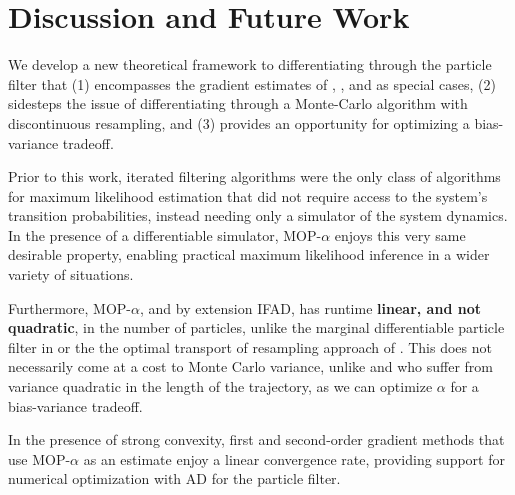 \documentclass{article}
\begin{document}





\section{Discussion and Future Work}

We develop a new theoretical framework to differentiating through the particle filter that (1) encompasses the gradient estimates of \cite{poyiadjis11}, \cite{blei2018vsmc}, and \cite{scibior2021dpf} as special cases, (2) sidesteps the issue of differentiating through a Monte-Carlo algorithm with discontinuous resampling, and (3) provides an opportunity for optimizing a bias-variance tradeoff. 

Prior to this work, iterated filtering algorithms were the only class of algorithms for maximum likelihood estimation that did not require access to the system's transition probabilities, instead needing only a simulator of the system dynamics. In the presence of a differentiable simulator, MOP-$\alpha$ enjoys this very same desirable property, enabling practical maximum likelihood inference in a wider variety of situations.

Furthermore, MOP-$\alpha$, and by extension IFAD, has runtime \textbf{linear, and not quadratic}, in the number of particles, unlike the marginal differentiable particle filter in \cite{scibior2021dpf} or the the optimal transport of resampling approach of \cite{corenflos21}. This does not necessarily come at a cost to Monte Carlo variance, unlike \cite{poyiadjis11} and \cite{corenflos2021ot} who suffer from variance quadratic in the length of the trajectory, as we can optimize $\alpha$ for a bias-variance tradeoff. 

In the presence of strong convexity, first and second-order gradient methods that use MOP-$\alpha$ as an estimate enjoy a linear convergence rate, providing support for numerical optimization with AD for the particle filter.
\end{document}
